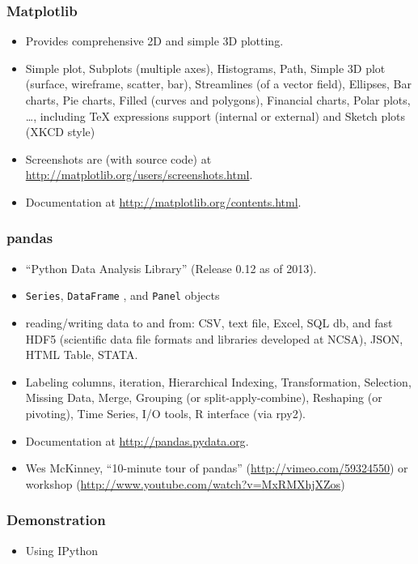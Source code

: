\documentclass{beamer}
\begin{document}
\begin{frame}[fragile]
\frametitle{Matplotlib}
\begin{itemize}
\item Provides comprehensive 2D and simple 3D plotting.
\item Simple plot, Subplots (multiple axes),
      Histograms, Path, Simple 3D plot (surface, wireframe, scatter, bar),
      Streamlines (of a vector field), Ellipses,
      Bar charts, Pie charts, Filled (curves and polygons),
      Financial charts, Polar plots, \ldots, including TeX expressions support
      (internal or external) and Sketch plots (XKCD style)
\item Screenshots are (with source code) at 
      \url{http://matplotlib.org/users/screenshots.html}.
\item Documentation at \url{http://matplotlib.org/contents.html}.
\end{itemize}
\end{frame}

\begin{frame}[fragile]
\frametitle{pandas}
\begin{itemize}
\item ``Python Data Analysis Library'' (Release 0.12 as of 2013).
\item \lstinline{Series}, \lstinline{DataFrame}
      , and \lstinline{Panel} objects
\item reading/writing data to and from: CSV,
      text file, Excel, SQL db, and fast HDF5 
      (scientific data file formats and libraries
       developed at NCSA), JSON, HTML Table, STATA.
\item Labeling columns, iteration, 
      Hierarchical Indexing, Transformation,
      Selection, Missing Data, Merge,
      Grouping (or split-apply-combine),
      Reshaping (or pivoting), Time Series,
      I/O tools, R interface (via rpy2).
\item Documentation at \url{http://pandas.pydata.org}.
\item Wes McKinney, ``10-minute tour of pandas''
      (\url{http://vimeo.com/59324550}) or workshop
      (\url{http://www.youtube.com/watch?v=MxRMXhjXZos})      
\end{itemize}
\end{frame}

\begin{frame}[fragile]
\frametitle{Demonstration}
\begin{itemize}
\item Using IPython
\end{itemize}
\end{frame}
\end{document}
